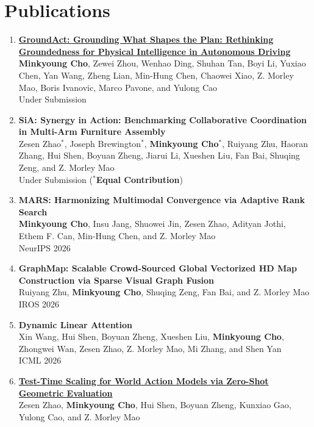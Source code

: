\documentclass[letterpaper,oneside,11pt]{article}
\begin{document}
\section{Publications}
\begin{enumerate}[leftmargin=*, itemsep=0em]
  \item \small \textbf{\href{https://groundact.github.io/}{GroundAct: Grounding What Shapes the Plan: Rethinking Groundedness for Physical Intelligence in Autonomous Driving}} \\
  \textbf{Minkyoung Cho}, Zewei Zhou, Wenhao Ding, Shuhan Tan, Boyi Li, Yuxiao Chen, Yan Wang, Zheng Lian, Min-Hung Chen, Chaowei Xiao, Z. Morley Mao, Boris Ivanovic, Marco Pavone, and Yulong Cao \\
  Under Submission
  \item \small \textbf{SiA: Synergy in Action: Benchmarking Collaborative Coordination in Multi-Arm Furniture Assembly} \\
  Zesen Zhao$^\ast$, Joseph Brewington$^\ast$, \textbf{Minkyoung Cho$^\ast$}, Ruiyang Zhu, Haoran Zhang, Hui Shen, Boyuan Zheng, Jiarui Li, Xueshen Liu, Fan Bai, Shuqing Zeng, and Z. Morley Mao \\
  Under Submission ($^\ast$\textbf{Equal Contribution})
  \item \small \textbf{MARS: Harmonizing Multimodal Convergence via Adaptive Rank Search} \\
  \textbf{Minkyoung Cho}, Insu Jang, Shuowei Jin, Zesen Zhao, Adityan Jothi, Ethem F. Can, Min-Hung Chen, and Z. Morley Mao \\
  NeurIPS 2026
  \item \small \textbf{GraphMap: Scalable Crowd-Sourced Global Vectorized HD Map Construction via Sparse Visual Graph Fusion} \\
  Ruiyang Zhu, \textbf{Minkyoung Cho}, Shuqing Zeng, Fan Bai, and Z. Morley Mao \\
  IROS 2026
  \item \small \textbf{Dynamic Linear Attention} \\
  Xin Wang, Hui Shen, Boyuan Zheng, Xueshen Liu, \textbf{Minkyoung Cho}, Zhongwei Wan, Zesen Zhao, Z. Morley Mao, Mi Zhang, and Shen Yan \\
  ICML 2026
  \item \small \textbf{\href{https://arxiv.org/abs/2607.17454}{Test-Time Scaling for World Action Models via Zero-Shot Geometric Evaluation}} \\
  Zesen Zhao, \textbf{Minkyoung Cho}, Hui Shen, Boyuan Zheng, Kunxiao Gao, Yulong Cao, and Z. Morley Mao \\

\end{enumerate}
\end{document}
